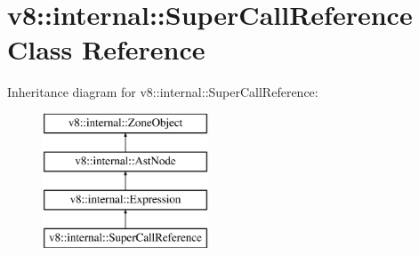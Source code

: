 \hypertarget{classv8_1_1internal_1_1_super_call_reference}{}\section{v8\+:\+:internal\+:\+:Super\+Call\+Reference Class Reference}
\label{classv8_1_1internal_1_1_super_call_reference}
Inheritance diagram for v8\+:\+:internal\+:\+:Super\+Call\+Reference\+:\begin{figure}[H]
\begin{center}
\leavevmode
\includegraphics[height=4.000000cm]{classv8_1_1internal_1_1_super_call_reference}
\end{center}
\end{figure}
